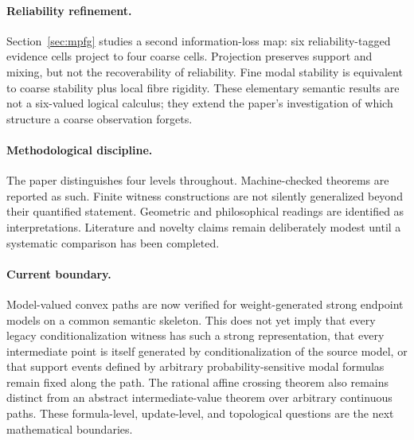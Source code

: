\paragraph{Reliability refinement.}
Section~\ref{sec:mpfg} studies a second information-loss map: six reliability-tagged evidence cells project to four coarse cells. Projection preserves support and mixing, but not the recoverability of reliability. Fine modal stability is equivalent to coarse stability plus local fibre rigidity. These elementary semantic results are not a six-valued logical calculus; they extend the paper's investigation of which structure a coarse observation forgets.

\paragraph{Methodological discipline.}
The paper distinguishes four levels throughout. Machine-checked theorems are reported as such. Finite witness constructions are not silently generalized beyond their quantified statement. Geometric and philosophical readings are identified as interpretations. Literature and novelty claims remain deliberately modest until a systematic comparison has been completed.

\paragraph{Current boundary.}
Model-valued convex paths are now verified for weight-generated strong endpoint models on a common semantic skeleton. This does not yet imply that every legacy conditionalization witness has such a strong representation, that every intermediate point is itself generated by conditionalization of the source model, or that support events defined by arbitrary probability-sensitive modal formulas remain fixed along the path. The rational affine crossing theorem also remains distinct from an abstract intermediate-value theorem over arbitrary continuous paths. These formula-level, update-level, and topological questions are the next mathematical boundaries.
